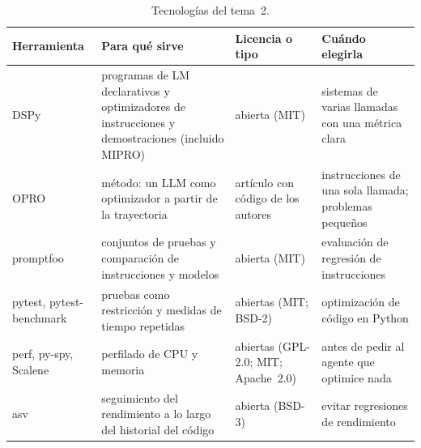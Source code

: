 \begin{table}[h]
\centering\small
\caption{Tecnologías del tema~2.}\label{tab:tec2}
\begin{tabularx}{\textwidth}{@{}>{\raggedright\arraybackslash}p{2.5cm}>{\raggedright\arraybackslash}X>{\raggedright\arraybackslash}p{2.1cm}>{\raggedright\arraybackslash}X@{}}
\toprule
Herramienta & Para qué sirve & Licencia o tipo & Cuándo elegirla \\
\midrule
DSPy~\cite{dspy} & programas de LM declarativos y optimizadores de instrucciones y demostraciones (incluido MIPRO) & abierta (MIT) & sistemas de varias llamadas con una métrica clara \\
OPRO~\cite{opro} & método: un LLM como optimizador a partir de la trayectoria & artículo con código de los autores & instrucciones de una sola llamada; problemas pequeños \\
promptfoo & conjuntos de pruebas y comparación de instrucciones y modelos & abierta (MIT) & evaluación de regresión de instrucciones \\
pytest, pytest-benchmark & pruebas como restricción y medidas de tiempo repetidas & abiertas (MIT; BSD-2) & optimización de código en Python \\
perf, py-spy, Scalene & perfilado de CPU y memoria & abiertas (GPL-2.0; MIT; Apache~2.0) & antes de pedir al agente que optimice nada \\
asv & seguimiento del rendimiento a lo largo del historial del código & abierta (BSD-3) & evitar regresiones de rendimiento \\
\bottomrule
\end{tabularx}
\end{table}

\addtocounter{definicion}{1}%

